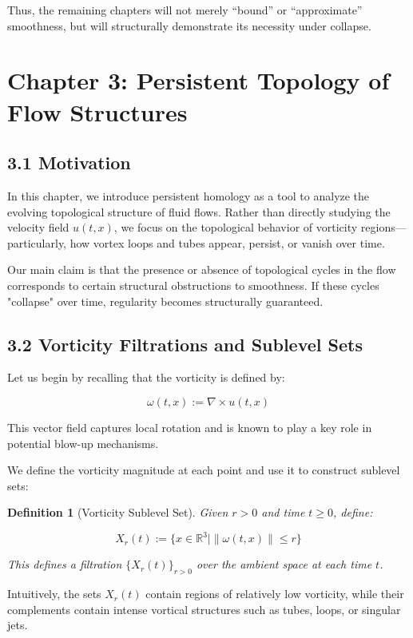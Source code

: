 \documentclass[11pt]{article}
\newtheorem{definition}[theorem]{Definition}
\begin{document}
Thus, the remaining chapters will not merely “bound” or “approximate” smoothness, but will structurally demonstrate its necessity under collapse.



\section{Chapter 3: Persistent Topology of Flow Structures}

\subsection{3.1 Motivation}

In this chapter, we introduce persistent homology as a tool to analyze the evolving topological structure of fluid flows.  
Rather than directly studying the velocity field \( u(t,x) \), we focus on the topological behavior of vorticity regions—particularly, how vortex loops and tubes appear, persist, or vanish over time.

Our main claim is that the presence or absence of topological cycles in the flow corresponds to certain structural obstructions to smoothness. If these cycles "collapse" over time, regularity becomes structurally guaranteed.

\subsection{3.2 Vorticity Filtrations and Sublevel Sets}

Let us begin by recalling that the vorticity is defined by:

\[
\omega(t,x) := \nabla \times u(t,x)
\]

This vector field captures local rotation and is known to play a key role in potential blow-up mechanisms.

We define the vorticity magnitude at each point and use it to construct sublevel sets:

\begin{definition}[Vorticity Sublevel Set]
Given \( r > 0 \) and time \( t \geq 0 \), define:

\[
X_r(t) := \{ x \in \mathbb{R}^3 \mid \|\omega(t,x)\| \le r \}
\]

This defines a filtration \( \{X_r(t)\}_{r > 0} \) over the ambient space at each time \( t \).
\end{definition}

Intuitively, the sets \( X_r(t) \) contain regions of relatively low vorticity, while their complements contain intense vortical structures such as tubes, loops, or singular jets.
\end{document}
